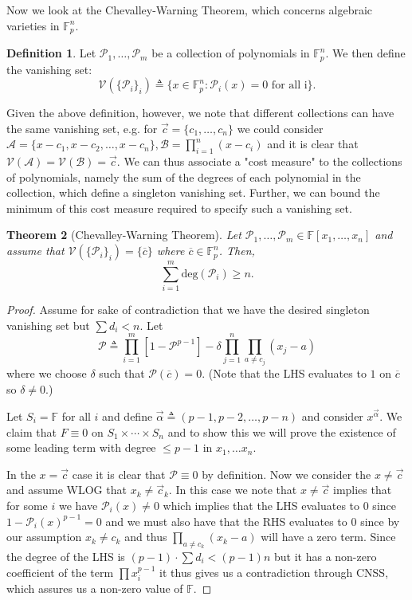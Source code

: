 \documentclass[11pt]{article}
\newtheorem{theorem}{Theorem}
\theoremstyle{definition}
\newtheorem{definition}[theorem]{Definition}
\numberwithin{equation}{subsection}
\begin{document}
Now we look at the Chevalley-Warning Theorem, which concerns algebraic varieties in $\mathbb{F}_p^n$.

\begin{definition}
Let $\mathcal{P}_1,\ldots,\mathcal{P}_m$ be a collection of polynomials in $\mathbb{F}_p^n$. We then define the vanishing set: $$\mathcal{V}(\{\mathcal{P}_i\}_i)\triangleq \{x\in\mathbb{F}_p^n\colon \mathcal{P}_i(x)=0\text{ for all i}\}.$$
\end{definition}

Given the above definition, however, we note that different collections can have the same vanishing set, e.g. for $\vec{c}=\{c_1,\ldots,c_n\}$ we could consider $\mathcal{A}=\{x-c_1,x-c_2,\ldots,x-c_n\}, \mathcal{B}=\prod_{i=1}^n(x-c_i)$ and it is clear that $\mathcal{V}(\mathcal{A})=\mathcal{V}(\mathcal{B})=\vec{c}$. We can thus associate a "cost measure" to the collections of polynomials, namely the sum of the degrees of each polynomial in the collection, which define a singleton vanishing set. Further, we can bound the minimum of this cost measure required to specify such a vanishing set.

\begin{theorem}[Chevalley-Warning Theorem]
Let $\mathcal{P}_1,\ldots,\mathcal{P}_m\in \mathbb{F}[x_1,\ldots,x_n]$ and assume that $\mathcal{V}(\{\mathcal{P}_i\}_i)=\{\overline{c}\}$ where $\overline{c}\in \mathbb{F}_p^n$. Then, $$\sum_{i=1}^m \text{deg}(\mathcal{P}_i)\geq n.$$
\end{theorem}

\begin{proof}
Assume for sake of contradiction that we have the desired singleton vanishing set but $\sum d_i<n$. Let $$\mathcal{P}\triangleq \prod_{i=1}^m \left[1-\mathcal{P}^{p-1}\right]-\delta\prod_{j=1}^n\prod_{a\neq c_j}(x_j-a)$$ where we choose $\delta$ such that $\mathcal{P}(\overline{c})=0$. (Note that the LHS evaluates to $1$ on $\overline{c}$ so $\delta\neq 0$.) 

Let $S_i=\mathbb{F}$ for all $i$ and define $\vec{\alpha}\triangleq (p-1,p-2,\ldots,p-n)$ and consider $x^{\vec{\alpha}}$. We claim that $F\equiv 0$ on $S_1\times\cdots\times S_n$ and to show this we will prove the existence of some leading term with degree $\leq p-1$ in $x_1,\ldots x_n$.

In the $x=\vec{c}$ case it is clear that $\mathcal{P}\equiv 0$ by definition. Now we consider the $x\neq\vec{c}$ and assume WLOG that $x_k\neq \vec{c}_k$. In this case we note that $x\neq\vec{c}$ implies that for some $i$ we have $\mathcal{P}_i(x)\neq 0$ which implies that the LHS evaluates to $0$ since $1-\mathcal{P}_i(x)^{p-1}=0$ and we must also have that the RHS evaluates to $0$ since by our assumption $x_k\neq c_k$ and thus $\prod_{a\neq c_k}(x_k-a)$ will have a zero term. Since the degree of the LHS is $(p-1)\cdot\sum d_i<(p-1)n$ but it has a non-zero coefficient of the term $\prod x_i^{p-1}$ it thus gives us a contradiction through CNSS, which assures us a non-zero value of $\mathbb{F}$.
\end{proof}
\end{document}
